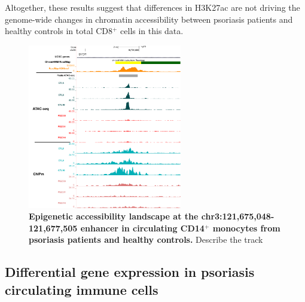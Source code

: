 Altogether, these results suggest that differences in H3K27ac are not driving the genome-wide changes in chromatin accessibility between psoriasis patients and healthy controls in total CD8$^+$ cells in this data. 

\begin{figure}[htbp]
\centering
\includegraphics[width=0.6\textwidth]{./Results2/pdfs/ChIPm_H3K27ac_UCSC_CD8_DTD1_track}
\caption[Epigenetic landscape at the chr3:121,675,048-121,677,505 enhancer in circulating CD14$^+$ monocytes from psoriasis patients and healthy controls.]{\textbf{Epigenetic accessibility landscape at the chr3:121,675,048-121,677,505 enhancer in circulating CD14$^+$ monocytes from psoriasis patients and healthy controls.} Describe the track }
\label{figure:ChIPm_H3K27ac_UCSC_ILDR1_track}
\end{figure}


\subsection{Differential gene expression in psoriasis circulating immune cells}

